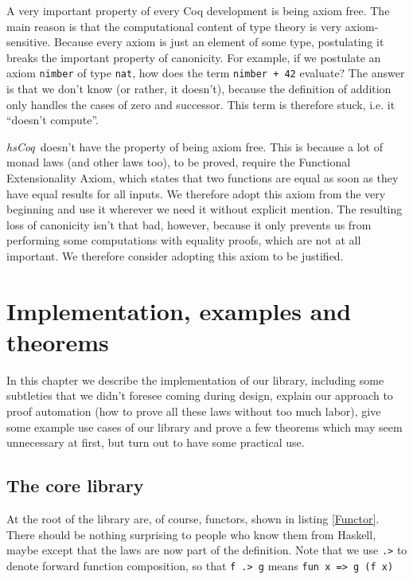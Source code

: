 \documentclass[declaration,inz,english,shortabstract]{iithesis}
\newcommand{\libname}{\textit{hsCoq}}
\newcommand{\m}[1]{\texttt{#1}}
\begin{document}
A very important property of every Coq development is being axiom free. The main reason is that the computational content of type theory is very axiom-sensitive. Because every axiom is just an element of some type, postulating it breaks the important property of canonicity. For example, if we postulate an axiom \m{nimber} of type \m{nat}, how does the term \m{nimber + 42} evaluate? The answer is that we don't know (or rather, it doesn't), because the definition of addition only handles the cases of zero and successor. This term is therefore stuck, i.e. it ``doesn't compute''.

\libname\ doesn't have the property of being axiom free. This is because a lot of monad laws (and other laws too), to be proved, require the Functional Extensionality Axiom, which states that two functions are equal as soon as they have equal results for all inputs. We therefore adopt this axiom from the very beginning and use it wherever we need it without explicit mention. The resulting loss of canonicity isn't that bad, however, because it only prevents us from performing some computations with equality proofs, which are not at all important. We therefore consider adopting this axiom to be justified.

\chapter{Implementation, examples and theorems}

In this chapter we describe the implementation of our library, including some subtleties that we didn't foresee coming during design, explain our approach to proof automation (how to prove all these laws without too much labor), give some example use cases of our library and prove a few theorems which may seem unnecessary at first, but turn out to have some practical use.

\section{The core library}


At the root of the library are, of course, functors, shown in listing \ref{Functor}. There should be nothing surprising to people who know them from Haskell, maybe except that the laws are now part of the definition. Note that we use \m{.>} to denote forward function composition, so that \m{f .> g} means \m{fun x => g (f x)}
\end{document}
